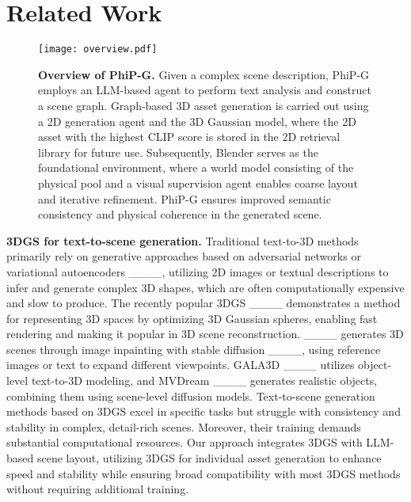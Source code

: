 \section{Related Work}
\begin{figure*}[!h]
\begin{center}
\centerline{\texttt{[image: overview.pdf]}}
\vskip -0.2in
\caption{\textbf{Overview of PhiP-G.} Given a complex scene description, PhiP-G employs an LLM-based agent to perform text analysis and construct a scene graph. Graph-based 3D asset generation is carried out using a 2D generation agent and the 3D Gaussian model, where the 2D asset with the highest CLIP score is stored in the 2D retrieval library for future use. 
Subsequently, Blender serves as the foundational environment, where a  world model consisting of the physical pool and a visual supervision agent enables coarse layout and iterative refinement. PhiP-G ensures improved semantic consistency and physical coherence in the generated scene.}
\label{overview}  
\end{center}
\vskip -0.4in
\end{figure*}
\textbf{3DGS for text-to-scene generation.}
Traditional text-to-3D methods primarily rely on generative approaches based on adversarial networks or variational autoencoders ____, utilizing 2D images or textual descriptions to infer and generate complex 3D shapes, which are often computationally expensive and slow to produce. The recently popular 3DGS ____ demonstrates a method for representing 3D spaces by optimizing 3D Gaussian spheres, enabling fast rendering and making it popular in 3D scene reconstruction. ____ generates 3D scenes through image inpainting with stable diffusion ____, using reference images or text to expand different viewpoints. GALA3D ____ utilizes object-level text-to-3D modeling, and MVDream ____ generates realistic objects, combining them using scene-level diffusion models. Text-to-scene generation methods based on 3DGS excel in specific tasks but struggle with consistency and stability in complex, detail-rich scenes. Moreover, their training demands substantial computational resources. Our approach integrates 3DGS with LLM-based scene layout, utilizing 3DGS for individual asset generation to enhance speed and stability while ensuring broad compatibility with most 3DGS methods without requiring additional training.

